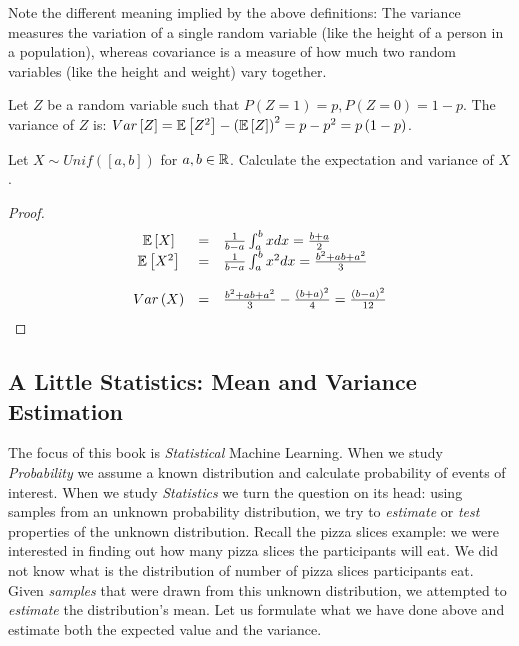 Note the different meaning implied by the above definitions: The variance measures the variation of a single random variable (like the height of a person in a population), whereas covariance is a measure of how much two random variables (like the height and weight) vary together.

\begin{example}
Let $Z$ be a random variable such that $P\left(Z=1\right) = p, P\left(Z=0\right) = 1-p$. The variance of $Z$ is: $Var\left[Z\right] = \mathbb{E} \left[Z^2\right] - \left(\mathbb{E} \left[Z\right]\right)^2 = p-p^2=p\left(1-p\right)$.
\end{example}

\begin{exercise}
Let $X\sim Unif\left(\left[a,b\right]\right)$ for $a,b\in\mathbb{R}$. Calculate the expectation and variance of $X$.
\end{exercise}
\begin{proof}
$$\begin{array}{ccl}
\mathbb{E} \left[X\right]  &=&  \frac{1}{b-a}\int_{a}^{b} xdx=\frac{b+a}{2}\\
\mathbb{E} \left[X^{2}\right]  &=& \frac{1}{b-a}\int_{a}^{b}x^2 dx =\frac{b^{2}+ab+a^{2}}{3}\\ \\
Var\left(X\right)  &=&  \frac{b^{2}+ab+a^{2}}{3}-\frac{\left(b+a\right)^{2}}{4}=\frac{\left(b-a\right)^{2}}{12}
\end{array}$$
\end{proof}



\subsection{A Little Statistics: Mean and Variance Estimation}
The focus of this book is {\em Statistical} Machine Learning.  When we study {\em Probability} we assume a known distribution and calculate probability of events of interest. When we study {\em Statistics} we turn the question on its head: using samples from an unknown probability distribution, we try to {\em estimate} or {\em test} properties of the unknown distribution. Recall the pizza slices example: we were interested in finding out how many pizza slices the participants will eat. We did not know what is the distribution of number of pizza slices participants eat. Given {\em samples} that were drawn from this unknown distribution, we attempted to {\em estimate}  the distribution's mean. Let us formulate what we have done above and estimate both the expected value and the variance.

